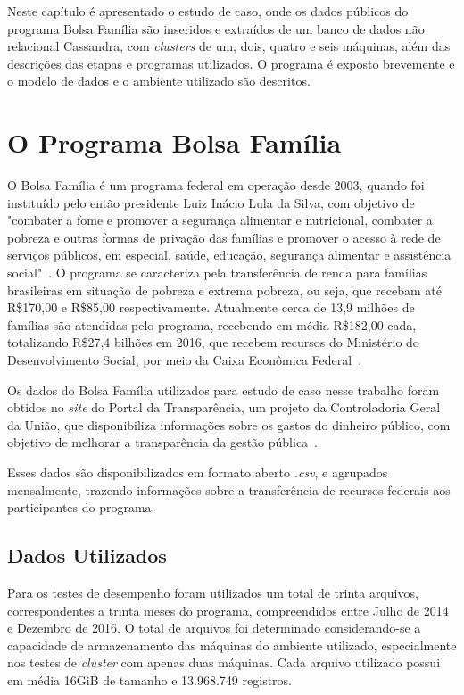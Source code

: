 Neste capítulo é apresentado o estudo de caso, onde os dados públicos do programa Bolsa Família são inseridos e extraídos de um banco de dados não relacional Cassandra, com \emph{clusters} de um, dois, quatro e seis máquinas, além das descrições das etapas e programas utilizados. O programa é exposto brevemente e o modelo de dados e o ambiente utilizado são descritos.

\section{O Programa Bolsa Família}
O Bolsa Família é um programa federal em operação desde 2003, quando foi instituído pelo então presidente Luiz Inácio Lula da Silva, com objetivo de "combater a fome e promover a segurança alimentar e nutricional, combater a pobreza e outras formas de privação das famílias e promover o acesso à rede de serviços públicos, em especial, saúde, educação, segurança alimentar e assistência social"~\cite{caixa-bolsafamilia}. 
O programa se caracteriza pela transferência de renda para famílias brasileiras em situação de pobreza e extrema pobreza, ou seja, que recebam até R\$170,00 e R\$85,00 respectivamente. Atualmente cerca de 13,9 milhões de famílias são atendidas pelo programa, recebendo em média R\$182,00 cada, totalizando R\$27,4 bilhões em 2016, que recebem recursos do Ministério do Desenvolvimento Social, por meio da Caixa Econômica Federal~\cite{gov-bolsafamilia1, gov-bolsafamilia2}.

Os dados do Bolsa Família utilizados para estudo de caso nesse trabalho foram obtidos no \emph{site} do Portal da Transparência, um projeto da Controladoria Geral da União, que disponibiliza informações sobre os gastos do dinheiro público, com objetivo de melhorar a transparência da gestão pública~\cite{sobreportaldatransparencia}. 

Esses dados são disponibilizados em formato aberto \emph{.csv}, e agrupados mensalmente, trazendo informações sobre a transferência de recursos federais aos participantes do programa. 

\subsection{Dados Utilizados}

Para os testes de desempenho foram utilizados um total de trinta arquivos, correspondentes a trinta meses do programa, compreendidos entre Julho de 2014 e Dezembro de 2016. O total de arquivos foi determinado considerando-se a capacidade de armazenamento das máquinas do ambiente utilizado, especialmente nos testes de \emph{cluster} com apenas duas máquinas. Cada arquivo utilizado possui em média 16GiB de tamanho e 13.968.749 registros.

